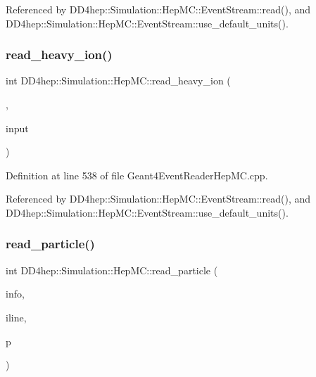 Referenced by D\+D4hep\+::\+Simulation\+::\+Hep\+M\+C\+::\+Event\+Stream\+::read(), and D\+D4hep\+::\+Simulation\+::\+Hep\+M\+C\+::\+Event\+Stream\+::use\+\_\+default\+\_\+units().

\hypertarget{namespace_d_d4hep_1_1_simulation_1_1_hep_m_c_a973a0fe661658598d3982e072e11f77d}{}\label{namespace_d_d4hep_1_1_simulation_1_1_hep_m_c_a973a0fe661658598d3982e072e11f77d} 
\subsubsection{\texorpdfstring{read\+\_\+heavy\+\_\+ion()}{read\_heavy\_ion()}}
{\footnotesize\ttfamily int D\+D4hep\+::\+Simulation\+::\+Hep\+M\+C\+::read\+\_\+heavy\+\_\+ion (\begin{DoxyParamCaption}\item[{\hyperlink{class_d_d4hep_1_1_simulation_1_1_hep_m_c_1_1_event_stream}{Event\+Stream} \&}]{,  }\item[{istringstream \&}]{input }\end{DoxyParamCaption})}



Definition at line 538 of file Geant4\+Event\+Reader\+Hep\+M\+C.\+cpp.



Referenced by D\+D4hep\+::\+Simulation\+::\+Hep\+M\+C\+::\+Event\+Stream\+::read(), and D\+D4hep\+::\+Simulation\+::\+Hep\+M\+C\+::\+Event\+Stream\+::use\+\_\+default\+\_\+units().

\hypertarget{namespace_d_d4hep_1_1_simulation_1_1_hep_m_c_ab38b9307ace39b3227306e907c3f6840}{}\label{namespace_d_d4hep_1_1_simulation_1_1_hep_m_c_ab38b9307ace39b3227306e907c3f6840} 
\subsubsection{\texorpdfstring{read\+\_\+particle()}{read\_particle()}}
{\footnotesize\ttfamily int D\+D4hep\+::\+Simulation\+::\+Hep\+M\+C\+::read\+\_\+particle (\begin{DoxyParamCaption}\item[{\hyperlink{class_d_d4hep_1_1_simulation_1_1_hep_m_c_1_1_event_stream}{Event\+Stream} \&}]{info,  }\item[{istringstream \&}]{iline,  }\item[{\hyperlink{class_d_d4hep_1_1_simulation_1_1_geant4_particle}{Geant4\+Particle} $\ast$}]{p }\end{DoxyParamCaption})}



